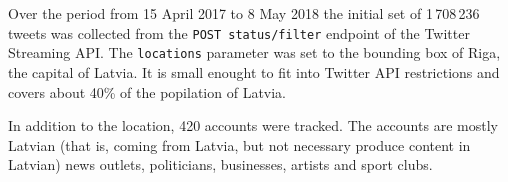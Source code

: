 \documentclass{IOS-Book-Article}
\newcommand{\hl}[1]{#1}
\begin{document}
Over the period from 15 April 2017 to \hl{8 May 2018} the initial set of \hl{1\,708\,236} tweets was collected from the \texttt{POST status/filter} endpoint of the Twitter Streaming API.%
%
%
The \texttt{locations} parameter was set to the bounding box of Riga, the capital of Latvia. It is small enought to fit into Twitter API restrictions and covers about 40\% of the popilation of Latvia.%
%

In addition to the location, 420 accounts were tracked.%
%
The accounts are mostly Latvian (that is, coming from Latvia, but not necessary produce content in Latvian) news outlets, politicians, businesses, artists and sport clubs. 



\end{document}
